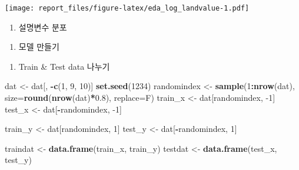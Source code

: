 \documentclass[]{article}
\newenvironment{Shaded}{\begin{snugshade}}{\end{snugshade}}
\newcommand{\DataTypeTok}[1]{\textcolor[rgb]{0.13,0.29,0.53}{#1}}
\newcommand{\DecValTok}[1]{\textcolor[rgb]{0.00,0.00,0.81}{#1}}
\newcommand{\FloatTok}[1]{\textcolor[rgb]{0.00,0.00,0.81}{#1}}
\newcommand{\KeywordTok}[1]{\textcolor[rgb]{0.13,0.29,0.53}{\textbf{#1}}}
\newcommand{\NormalTok}[1]{#1}
\newcommand{\OperatorTok}[1]{\textcolor[rgb]{0.81,0.36,0.00}{\textbf{#1}}}
\newcommand{\StringTok}[1]{\textcolor[rgb]{0.31,0.60,0.02}{#1}}
\providecommand{\tightlist}{%
  \setlength{\itemsep}{0pt}\setlength{\parskip}{0pt}}
\begin{document}
\texttt{[image: report\_files/figure-latex/eda\_log\_landvalue-1.pdf]}

\begin{Shaded}
\end{Shaded}

\begin{enumerate}
\def\labelenumi{\arabic{enumi})}
\setcounter{enumi}{1}
\tightlist
\item
  설명변수 분포
\end{enumerate}

\begin{enumerate}
\def\labelenumi{\arabic{enumi}.}
\setcounter{enumi}{3}
\tightlist
\item
  모델 만들기
\end{enumerate}

\begin{enumerate}
\def\labelenumi{\arabic{enumi})}
\tightlist
\item
  Train \& Test data 나누기
\end{enumerate}

\begin{Shaded}
\begin{Highlighting}[]
\NormalTok{dat <-}\StringTok{ }\NormalTok{dat[, }\OperatorTok{-}\KeywordTok{c}\NormalTok{(}\DecValTok{1}\NormalTok{, }\DecValTok{9}\NormalTok{, }\DecValTok{10}\NormalTok{)]}
\KeywordTok{set.seed}\NormalTok{(}\DecValTok{1234}\NormalTok{)}
\NormalTok{randomindex <-}\StringTok{ }\KeywordTok{sample}\NormalTok{(}\DecValTok{1}\OperatorTok{:}\KeywordTok{nrow}\NormalTok{(dat), }\DataTypeTok{size=}\KeywordTok{round}\NormalTok{(}\KeywordTok{nrow}\NormalTok{(dat)}\OperatorTok{*}\FloatTok{0.8}\NormalTok{), }\DataTypeTok{replace=}\NormalTok{F)}
\NormalTok{train_x <-}\StringTok{ }\NormalTok{dat[randomindex, }\DecValTok{-1}\NormalTok{]}
\NormalTok{test_x <-}\StringTok{ }\NormalTok{dat[}\OperatorTok{-}\NormalTok{randomindex, }\DecValTok{-1}\NormalTok{]}

\NormalTok{train_y <-}\StringTok{ }\NormalTok{dat[randomindex, }\DecValTok{1}\NormalTok{]}
\NormalTok{test_y <-}\StringTok{ }\NormalTok{dat[}\OperatorTok{-}\NormalTok{randomindex, }\DecValTok{1}\NormalTok{]}

\NormalTok{traindat <-}\StringTok{ }\KeywordTok{data.frame}\NormalTok{(train_x, train_y)}
\NormalTok{testdat <-}\StringTok{ }\KeywordTok{data.frame}\NormalTok{(test_x, test_y)}
\end{Highlighting}
\end{Shaded}
\end{document}
